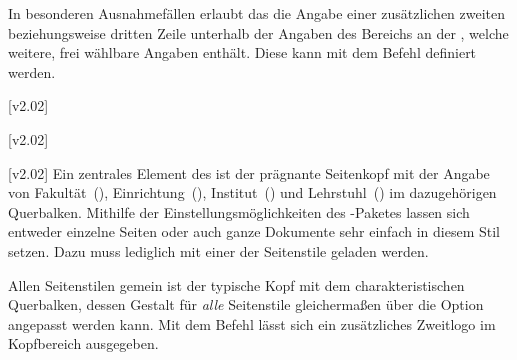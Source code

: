 \begin{DeclareEntity*}{}
\begin{DeclareEntity*}{}
\begin{DeclareEntity*}{}
\begin{Declaration}
\begin{Declaration}
\begin{Declaration}
\begin{Declaration}
\begin{Declaration}
In besonderen Ausnahmefällen erlaubt das \CD die Angabe einer zusätzlichen
zweiten beziehungsweise dritten Zeile unterhalb der Angaben des Bereichs an der 
\TnUD, welche weitere, frei wählbare Angaben enthält. Diese kann mit dem Befehl 
 definiert werden.
\end{Declaration}
\end{Declaration}
\end{Declaration}
\end{Declaration}
\end{Declaration}
%
\begin{Declaration}
  {}
  [v2.02]
\begin{Declaration}
  {}
  [v2.02]
\begin{Declaration}
  {}
  [v2.02]
%
Ein zentrales Element des \TUDCDs ist der prägnante Seitenkopf mit der Angabe 
von Fakultät~(), Einrichtung~(), 
Institut~() und Lehrstuhl~() im dazugehörigen 
Querbalken. Mithilfe der Einstellungsmöglichkeiten des \KOMAScript-Paketes 
 lassen sich entweder einzelne Seiten oder auch ganze 
Dokumente sehr einfach in diesem Stil setzen. Dazu muss lediglich mit 
 einer der Seitenstile geladen werden. 

%
Allen Seitenstilen gemein ist der typische Kopf mit dem charakteristischen 
Querbalken, dessen Gestalt für \emph{alle} Seitenstile gleichermaßen über die 
Option  angepasst werden kann. Mit dem Befehl  
lässt sich ein zusätzliches Zweitlogo im Kopfbereich ausgegeben.


\end{Declaration}
\end{Declaration}
\end{Declaration}
\end{DeclareEntity*}
\end{DeclareEntity*}
\end{DeclareEntity*}
